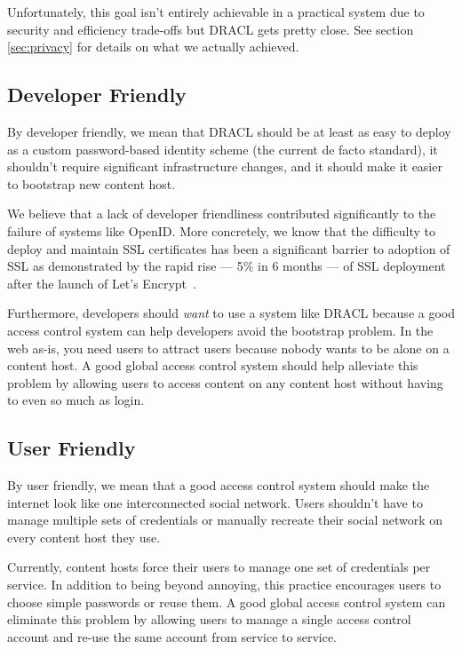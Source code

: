 \documentclass[pdftex,12pt,a4papaer]{report}
\begin{document}
Unfortunately, this goal isn't entirely achievable in a practical system due to
security and efficiency trade-offs but DRACL gets pretty close. See section
\ref{sec:privacy} for details on what we actually achieved.

\subsection{Developer Friendly}
\label{sub:goal-developer}

By developer friendly, we mean that DRACL should be at least as easy to deploy
as a custom password-based identity scheme (the current de facto standard), it 
shouldn't require significant infrastructure changes, and it should make it
easier to bootstrap new content host.

We believe that a lack of developer friendliness contributed significantly to
the failure of systems like OpenID\cite{openid}. More concretely, we know that
the difficulty to deploy and maintain SSL certificates has been a significant
barrier to adoption of SSL as demonstrated by the rapid rise --- 5\% in 6 months
--- of SSL deployment after the launch of Let's Encrypt~\cite{lets-encrypt}.

Furthermore, developers should \emph{want} to use a system like DRACL because a
good access control system can help developers avoid the bootstrap problem. In
the web as-is, you need users to attract users because nobody wants to be alone
on a content host. A good global access control system should help alleviate
this problem by allowing users to access content on any content host without
having to even so much as login.

\subsection{User Friendly}
\label{sub:goal-user}

By user friendly, we mean that a good access control system should make the
internet look like one interconnected social network. Users shouldn't have to
manage multiple sets of credentials or manually recreate their social network on
every content host they use.

Currently, content hosts force their users to manage one set of credentials
per service. In addition to being beyond annoying, this practice encourages
users to choose simple passwords or reuse them. A good global access control
system can eliminate this problem by allowing users to manage a single access
control account and re-use the same account from service to service.
\end{document}
